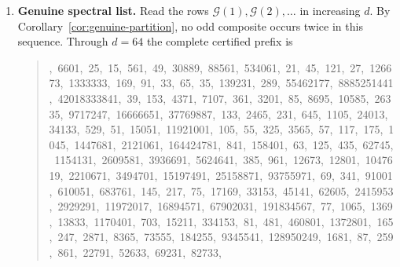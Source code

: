 \documentclass[11pt]{article}
\begin{document}
\begin{enumerate}
\item \textbf{Genuine spectral list.}
Read the rows $\mathcal G(1),\mathcal G(2),\ldots$ in increasing $d$.  By
Corollary~\ref{cor:genuine-partition}, no odd composite occurs twice in this
sequence.  Through $d=64$ the complete certified prefix is
\begin{quote}\small{},\allowbreak\ 6601,\allowbreak\ 25,\allowbreak\ 15,\allowbreak\ 561,\allowbreak\ 49,\allowbreak\
30889,\allowbreak\ 88561,\allowbreak\ 534061,\allowbreak\ 21,\allowbreak\ 45,\allowbreak\ 121,\allowbreak\
27,\allowbreak\ 126673,\allowbreak\ 1333333,\allowbreak\ 169,\allowbreak\ 91,\allowbreak\ 33,\allowbreak\
65,\allowbreak\ 35,\allowbreak\ 139231,\allowbreak\ 289,\allowbreak\ 55462177,\allowbreak\
8885251441,\allowbreak\ 42018333841,\allowbreak\ 39,\allowbreak\ 153,\allowbreak\ 4371,\allowbreak\
7107,\allowbreak\ 361,\allowbreak\ 3201,\allowbreak\ 85,\allowbreak\ 8695,\allowbreak\ 10585,\allowbreak\
26335,\allowbreak\ 9717247,\allowbreak\ 16666651,\allowbreak\ 37769887,\allowbreak\ 133,\allowbreak\
2465,\allowbreak\ 231,\allowbreak\ 645,\allowbreak\ 1105,\allowbreak\ 24013,\allowbreak\ 34133,\allowbreak\
529,\allowbreak\ 51,\allowbreak\ 15051,\allowbreak\ 11921001,\allowbreak\ 105,\allowbreak\ 55,\allowbreak\
325,\allowbreak\ 3565,\allowbreak\ 57,\allowbreak\ 117,\allowbreak\ 175,\allowbreak\ 1045,\allowbreak\
1447681,\allowbreak\ 2121061,\allowbreak\ 164424781,\allowbreak\ 841,\allowbreak\ 158401,\allowbreak\
63,\allowbreak\ 125,\allowbreak\ 435,\allowbreak\ 62745,\allowbreak\ 1154131,\allowbreak\
2609581,\allowbreak\ 3936691,\allowbreak\ 5624641,\allowbreak\ 385,\allowbreak\ 961,\allowbreak\
12673,\allowbreak\ 12801,\allowbreak\ 1047619,\allowbreak\ 2210671,\allowbreak\ 3494701,\allowbreak\
15197491,\allowbreak\ 25158871,\allowbreak\ 93755971,\allowbreak\ 69,\allowbreak\ 341,\allowbreak\
91001,\allowbreak\ 610051,\allowbreak\ 683761,\allowbreak\ 145,\allowbreak\ 217,\allowbreak\ 75,\allowbreak\
17169,\allowbreak\ 33153,\allowbreak\ 45141,\allowbreak\ 62605,\allowbreak\ 2415953,\allowbreak\
2929291,\allowbreak\ 11972017,\allowbreak\ 16894571,\allowbreak\ 67902031,\allowbreak\ 191834567,\allowbreak\
77,\allowbreak\ 1065,\allowbreak\ 1369,\allowbreak\ 13833,\allowbreak\ 1170401,\allowbreak\ 703,\allowbreak\
15211,\allowbreak\ 334153,\allowbreak\ 81,\allowbreak\ 481,\allowbreak\ 460801,\allowbreak\
1372801,\allowbreak\ 165,\allowbreak\ 247,\allowbreak\ 2871,\allowbreak\ 8365,\allowbreak\ 73555,\allowbreak\
184255,\allowbreak\ 9345541,\allowbreak\ 128950249,\allowbreak\ 1681,\allowbreak\ 87,\allowbreak\
259,\allowbreak\ 861,\allowbreak\ 22791,\allowbreak\ 52633,\allowbreak\ 69231,\allowbreak\ 82733,\allowbreak\

\end{quote}
\end{enumerate}
\end{document}

